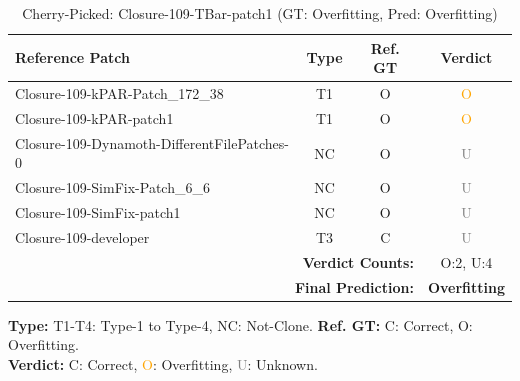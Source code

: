 \begin{table}[t]
\centering
\caption{Cherry-Picked: Closure-109-TBar-patch1 (GT: Overfitting, Pred: Overfitting)}
\label{tab:cherry-Closure109TBarpatch1}
\footnotesize
\renewcommand{\arraystretch}{1.1}
\setlength{\tabcolsep}{4pt}
\begin{tabular}{l|c|c|c}
\hline
\textbf{Reference Patch} & \textbf{Type} & \textbf{Ref. GT} & \textbf{Verdict} \\
\hline
Closure-109-kPAR-Patch\_172\_38 & T1 & O & \textcolor{orange}{O} \\
Closure-109-kPAR-patch1 & T1 & O & \textcolor{orange}{O} \\
Closure-109-Dynamoth-DifferentFilePatches-0 & NC & O & \textcolor{gray}{U} \\
Closure-109-SimFix-Patch\_6\_6 & NC & O & \textcolor{gray}{U} \\
Closure-109-SimFix-patch1 & NC & O & \textcolor{gray}{U} \\
Closure-109-developer & T3 & C & \textcolor{gray}{U} \\
\hline
\multicolumn{3}{r|}{\textbf{Verdict Counts:}} & O:2, U:4 \\
\multicolumn{3}{r|}{\textbf{Final Prediction:}} & \textbf{Overfitting} \\
\hline
\end{tabular}
\vspace{1mm}
\parbox{\linewidth}{\centering\footnotesize 
\vspace{1mm}
\textbf{Type:} T1-T4: Type-1 to Type-4, NC: Not-Clone. \;
\textbf{Ref. GT:} C: Correct, O: Overfitting. \\
\textbf{Verdict:} \textcolor{green!60!black}{C}: Correct, \textcolor{orange}{O}: Overfitting, \textcolor{gray}{U}: Unknown.}
\end{table}


